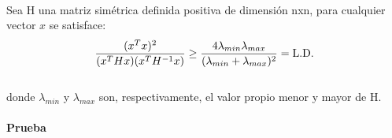 \documentclass[12pt]{article}
\begin{document}
\\

 Sea H una matriz sim\'etrica definida positiva de dimensi\'on nxn, para cualquier vector $x$ se satisface: \\
	
	 \[
              	\frac{(x^Tx)^2}{(x^THx)(x^TH^{-1}x)} \ge \frac{4\lambda_{min}\lambda_{max}}{(\lambda_{min}+\lambda_{max})^2} = \text{L.D.} \\
        	\]
	\noindent \\ {}	
	\noindent donde $\lambda_{min}$ y $\lambda_{max}$ son, respectivamente, el valor propio menor y mayor de H.\\

	\noindent \\ {\bf Prueba} \\
	
\end{document}
